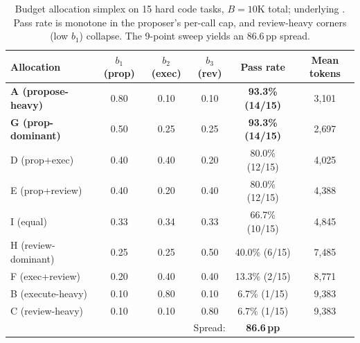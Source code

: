 \begin{table}[H]
\centering
\caption{Budget allocation simplex on 15 hard code tasks, $B = 10$K total; underlying . Pass rate is monotone in the proposer's per-call cap, and review-heavy corners (low $b_1$) collapse. The 9-point sweep yields an 86.6\,pp spread.}
\label{tab:allocation}
\small
\begin{tabular}{lccccc}
\toprule
Allocation & $b_1$ (prop) & $b_2$ (exec) & $b_3$ (rev) & Pass rate & Mean tokens \\
\midrule
\textbf{A (propose-heavy)} & 0.80 & 0.10 & 0.10 & \textbf{93.3\% (14/15)} & 3{,}101 \\
\textbf{G (prop-dominant)} & 0.50 & 0.25 & 0.25 & \textbf{93.3\% (14/15)} & 2{,}697 \\
D (prop+exec)              & 0.40 & 0.40 & 0.20 & 80.0\% (12/15) & 4{,}025 \\
E (prop+review)            & 0.40 & 0.20 & 0.40 & 80.0\% (12/15) & 4{,}388 \\
I (equal)                  & 0.33 & 0.34 & 0.33 & 66.7\% (10/15) & 4{,}845 \\
H (review-dominant)        & 0.25 & 0.25 & 0.50 & 40.0\% (6/15)  & 7{,}485 \\
F (exec+review)            & 0.20 & 0.40 & 0.40 & 13.3\% (2/15)  & 8{,}771 \\
B (execute-heavy)          & 0.10 & 0.80 & 0.10 & \phantom{0}6.7\% (1/15)  & 9{,}383 \\
C (review-heavy)           & 0.10 & 0.10 & 0.80 & \phantom{0}6.7\% (1/15)  & 9{,}383 \\
\midrule
\multicolumn{4}{r}{Spread:} & \textbf{86.6\,pp} & \\
\bottomrule
\end{tabular}
\end{table}

